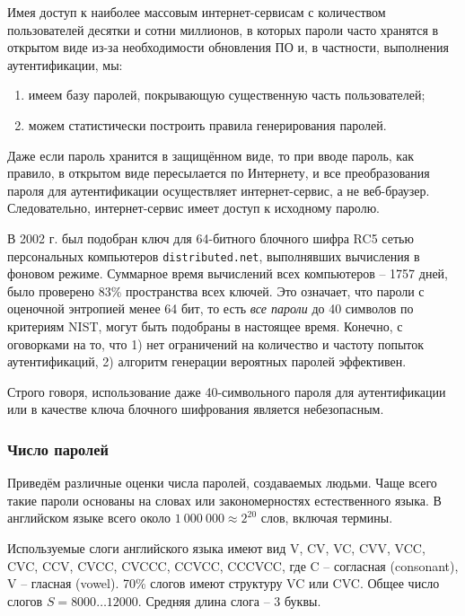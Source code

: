 Имея доступ к наиболее массовым интернет-сервисам с количеством пользователей десятки и сотни миллионов, в которых пароли часто хранятся в открытом виде из-за необходимости обновления ПО и, в частности, выполнения аутентификации, мы:
\begin{enumerate}
	\item имеем базу паролей, покрывающую существенную часть пользователей; 
	\item можем статистически построить правила генерирования паролей.
\end{enumerate}

Даже если пароль хранится в защищённом виде, то при вводе пароль, как правило, в открытом виде пересылается по Интернету, и все преобразования пароля для аутентификации осуществляет интернет-сервис, а не веб-браузер. Следовательно, интернет-сервис имеет доступ к исходному паролю.
\exampleend

В 2002 г. был подобран ключ для 64-битного блочного шифра RC5 сетью персональных компьютеров \texttt{distributed.net}, выполнявших вычисления в фоновом режиме. Суммарное время вычислений всех компьютеров -- 1757 дней, было проверено 83\% пространства всех ключей. Это означает, что пароли с оценочной энтропией менее 64 бит, то есть \emph{все пароли} до 40 символов по критериям NIST, могут быть подобраны в настоящее время. Конечно, с оговорками на то, что 1) нет ограничений на количество и частоту попыток аутентификаций, 2) алгоритм генерации вероятных паролей эффективен.

Строго говоря, использование даже 40-символьного пароля для аутентификации или в качестве ключа блочного шифрования является небезопасным.


\subsubsection{Число паролей}

Приведём различные оценки числа паролей, создаваемых людьми. Чаще всего такие пароли основаны на словах или закономерностях естественного языка. В английском языке всего около $1\ 000\ 000 \approx 2^{20}$ слов, включая термины.


Используемые слоги английского языка имеют вид V, CV, VC, CVV, VCC, CVC, CCV, CVCC, CVCCC, CCVCC, CCCVCC, где C -- согласная (consonant), V -- гласная (vowel). 70\% слогов имеют структуру VC или CVC. Общее число слогов $S = 8000 \dots 12000$. Средняя длина слога -- 3 буквы.

